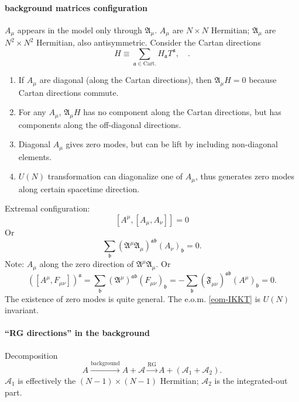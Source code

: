 
\paragraph{background matrices configuration}
$A_\mu$ appears in the model only through $\mathfrak{A}_\mu$.
$A_\mu$ are $N\times N$ Hermitian;
$\mathfrak{A}_\mu$ are $N^2\times N^2$ Hermitian, also antisymmetric.
Consider the Cartan directions
\[
	H \equiv
	\sum_{\mathfrak{a}\in \text{Cart.}} H_{\mathfrak{a}} T^{\mathfrak{a}},\quad
.\] 
\begin{enumerate}
	\item If $A_\mu$ are diagonal (along the Cartan directions),
		then $\mathfrak{A}_\mu H = 0$ because Cartan directions commute.
	\item For any $A_\mu$, $\mathfrak{A}_\mu H$ has no component
		along the Cartan directions,
		but has components along the off-diagonal directions.
	\item Diagonal $A_\mu$ gives zero modes,
		but can be lift by including non-diagonal elements.
	\item $U(N)$ transformation can diagonalize one of $A_\mu$,
		thus generates zero modes along certain spacetime direction.
\end{enumerate}

Extremal configuration:
\begin{equation}\label{eom-IKKT}
	[A^\mu,[A_\mu,A_\nu]]=0
\end{equation}
Or
\[
	\sum_{\mathfrak{b}}
	(\mathfrak{A}^\mu \mathfrak{A}_\mu)^{\mathfrak{a}\mathfrak{b}}
	(A_\nu)_{\mathfrak{b}} = 0
.\] 
Note: $A_\mu$ along the zero direction of $\mathfrak{A}^\mu \mathfrak{A}_\mu$.
Or
\[
	([A^\mu,F_{\mu\nu}])^{\mathfrak{a}} = \sum_{\mathfrak{b}}
	(\mathfrak{A}^\mu)^{\mathfrak{a}\mathfrak{b}} (F_{\mu\nu})_{\mathfrak{b}}
	= - \sum_{\mathfrak{b}} (\mathfrak{F}_{\mu\nu})^{\mathfrak{a}\mathfrak{b}}
	(A^\mu)_{\mathfrak{b}}
	=0
.\] 
The existence of zero modes is quite general.
The e.o.m. \eqref{eom-IKKT} is $U(N)$ invariant.

\paragraph{``RG directions'' in the background}
Decomposition
\[
	A \stackrel{\text{background}}{\to} A + \mathcal{A}
	\stackrel{\text{RG}}{\to} A + (\mathcal{A}_1 + \mathcal{A}_2)
.\] 
$\mathcal{A}_1$ is effectively the $(N-1)\times(N-1)$ Hermitian;
$\mathcal{A}_2$ is the integrated-out part.


